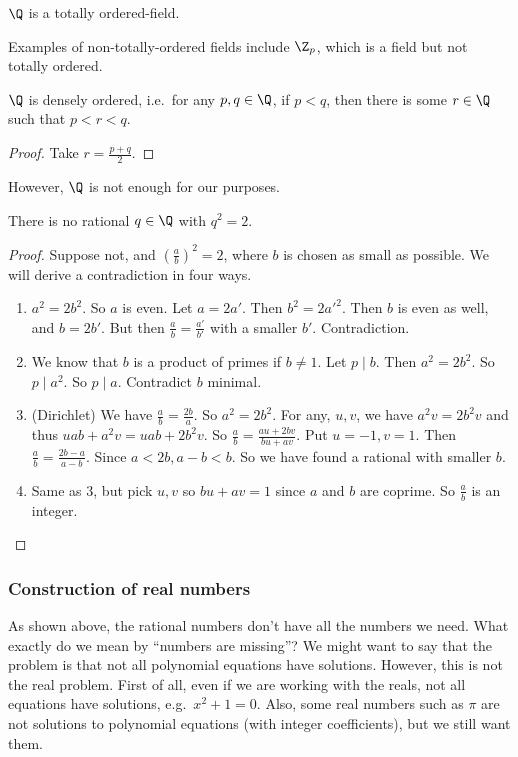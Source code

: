 \documentclass[a4paper]{article}
\begin{document}
\begin{prop}
  $\Q$ is a totally ordered-field.
\end{prop}

Examples of non-totally-ordered fields include $\Z_p$, which is a field but not totally ordered.
\begin{prop}
  $\Q$ is densely ordered, i.e.\ for any $p, q \in \Q$, if $p < q$, then there is some $r \in \Q$ such that $p < r < q$.
\end{prop}
\begin{proof}
  Take $r = \frac{p + q}{2}$.
\end{proof}

However, $\Q$ is not enough for our purposes.
\begin{prop}
  There is no rational $q\in \Q$ with $q^2 = 2$.
\end{prop}

\begin{proof}
  Suppose not, and $(\frac{a}{b})^2 = 2$, where $b$ is chosen as small as possible. We will derive a contradiction in four ways.
  \begin{enumerate}
    \item $a^2 = 2b^2$. So $a$ is even. Let $a = 2a'$. Then $b^2 = 2a'^2$. Then $b$ is even as well, and $b = 2b'$. But then $\frac{a}{b} = \frac{a'}{b'}$ with a smaller $b'$. Contradiction.
    \item We know that $b$ is a product of primes if $b \not= 1$. Let $p \mid b$. Then $a^2 = 2b^2$. So $p \mid a^2$. So $p \mid a$. Contradict $b$ minimal.
    \item (Dirichlet) We have $\frac{a}{b} = \frac{2b}{a}$. So $a^2 = 2b^2$. For any, $u, v$, we have $a^2v = 2b^2v$ and thus $uab + a^2v = uab + 2b^2v$. So $\frac{a}{b} = \frac{au + 2bv}{bu + av}$. Put $u = -1, v = 1$. Then $\frac{a}{b} = \frac{2b - a}{a - b}$. Since $a < 2b, a - b < b$. So we have found a rational with smaller $b$.
    \item Same as 3, but pick $u, v$ so $bu + av = 1$ since $a$ and $b$ are coprime. So $\frac{a}{b}$ is an integer.\qedhere
  \end{enumerate}
\end{proof}

\subsubsection*{Construction of real numbers}
As shown above, the rational numbers don't have all the numbers we need. What exactly do we mean by ``numbers are missing''? We might want to say that the problem is that not all polynomial equations have solutions. However, this is not the real problem. First of all, even if we are working with the reals, not all equations have solutions, e.g.\ $x^2 + 1 = 0$. Also, some real numbers such as $\pi$ are not solutions to polynomial equations (with integer coefficients), but we still want them.
\end{document}
